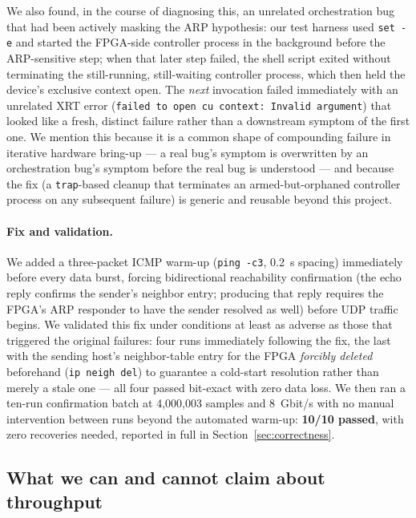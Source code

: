 \documentclass[11pt,a4paper]{article}
\newcommand{\code}[1]{\texttt{#1}}
\begin{document}
We also found, in the course of diagnosing this, an unrelated
orchestration bug that had been actively masking the ARP hypothesis: our
test harness used \code{set -e} and started the FPGA-side controller
process in the background before the ARP-sensitive step; when that later
step failed, the shell script exited without terminating the
still-running, still-waiting controller process, which then held the
device's exclusive context open. The \emph{next} invocation failed
immediately with an unrelated XRT error
(\code{failed to open cu context: Invalid argument}) that looked like a
fresh, distinct failure rather than a downstream symptom of the first
one. We mention this because it is a common shape of compounding failure
in iterative hardware bring-up --- a real bug's symptom is overwritten by
an orchestration bug's symptom before the real bug is understood --- and
because the fix (a \code{trap}-based cleanup that terminates an
armed-but-orphaned controller process on any subsequent failure) is
generic and reusable beyond this project.

\paragraph{Fix and validation.}
We added a three-packet ICMP warm-up (\code{ping -c3}, 0.2~s spacing)
immediately before every data burst, forcing bidirectional reachability
confirmation (the echo reply confirms the sender's neighbor entry;
producing that reply requires the FPGA's ARP responder to have the
sender resolved as well) before UDP traffic begins. We validated this
fix under conditions at least as adverse as those that triggered the
original failures: four runs immediately following the fix, the last
with the sending host's neighbor-table entry for the FPGA
\emph{forcibly deleted} beforehand (\code{ip neigh del}) to guarantee a
cold-start resolution rather than merely a stale one --- all four passed
bit-exact with zero data loss. We then ran a ten-run confirmation batch
at 4{,}000{,}003 samples and 8~Gbit/s with no manual intervention
between runs beyond the automated warm-up: \textbf{10/10 passed}, with
zero recoveries needed, reported in full in
Section~\ref{sec:correctness}.

\subsection{What we can and cannot claim about throughput}
\end{document}

